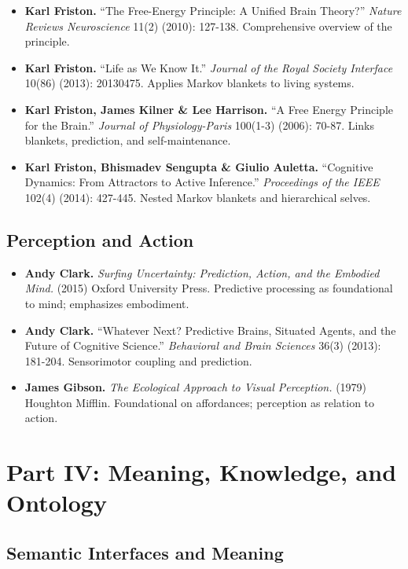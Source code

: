 \documentclass[
  openright]{book}
\begin{document}
\begin{itemize}
\item
  \textbf{Karl Friston.} ``The Free-Energy Principle: A Unified Brain
  Theory?'' \emph{Nature Reviews Neuroscience} 11(2) (2010): 127-138.
  Comprehensive overview of the principle.
\item
  \textbf{Karl Friston.} ``Life as We Know It.'' \emph{Journal of the
  Royal Society Interface} 10(86) (2013): 20130475. Applies Markov
  blankets to living systems.
\item
  \textbf{Karl Friston, James Kilner \& Lee Harrison.} ``A Free Energy
  Principle for the Brain.'' \emph{Journal of Physiology-Paris} 100(1-3)
  (2006): 70-87. Links blankets, prediction, and self-maintenance.
\item
  \textbf{Karl Friston, Bhismadev Sengupta \& Giulio Auletta.}
  ``Cognitive Dynamics: From Attractors to Active Inference.''
  \emph{Proceedings of the IEEE} 102(4) (2014): 427-445. Nested Markov
  blankets and hierarchical selves.
\end{itemize}

\subsection{Perception and Action}\label{perception-and-action}

\begin{itemize}
\item
  \textbf{Andy Clark.} \emph{Surfing Uncertainty: Prediction, Action,
  and the Embodied Mind.} (2015) Oxford University Press. Predictive
  processing as foundational to mind; emphasizes embodiment.
\item
  \textbf{Andy Clark.} ``Whatever Next? Predictive Brains, Situated
  Agents, and the Future of Cognitive Science.'' \emph{Behavioral and
  Brain Sciences} 36(3) (2013): 181-204. Sensorimotor coupling and
  prediction.
\item
  \textbf{James Gibson.} \emph{The Ecological Approach to Visual
  Perception.} (1979) Houghton Mifflin. Foundational on affordances;
  perception as relation to action.
\end{itemize}

\section{Part IV: Meaning, Knowledge, and
Ontology}\label{part-iv-meaning-knowledge-and-ontology}

\subsection{Semantic Interfaces and
Meaning}\label{semantic-interfaces-and-meaning}
\end{document}
